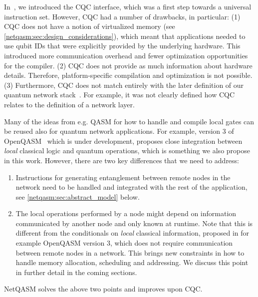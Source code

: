 In~\cite{dahlberg2018simulaqron}, we introduced the \ac{CQC} interface, which was a first step towards a universal instruction set.
However, \ac{CQC} had a number of drawbacks, in particular:
    (1) \ac{CQC} does not have a notion of virtualized memory (see \cref{netqasm:sec:design_considerations}), which meant that applications needed to use qubit IDs that were explicitly provided by the underlying hardware.
        This introduced more communication overhead and fewer optimization opportunities for the compiler.
    (2) \ac{CQC} does not provide as much information about hardware details.
        Therefore, platform-specific compilation and optimization is not possible.
    (3) Furthermore, \ac{CQC} does not match entirely with the later definition of our quantum network stack~\cite{dahlberg2019linklayer, kozlowski2020networklayer}.
        For example, it was not clearly defined how \ac{CQC} relates to the definition of a network layer.

Many of the ideas from e.g. QASM for how to handle and compile local gates can be reused also for quantum network applications.
For example, version 3 of OpenQASM~\cite{cross2021openqasm} which is under development, proposes close integration between \emph{local} classical logic and quantum operations, which is something we also propose in this work.
However, there are two key differences that we need to address:
\begin{enumerate}
      \item Instructions for generating entanglement between remote nodes in the network need to be handled and integrated with the rest of the application, see \cref{netqasm:sec:abstract_model} below.
      \item The local operations performed by a node might depend on information communicated by another node and only known at runtime.
            Note that this is different from the conditionals on \emph{local} classical information, proposed in for example OpenQASM version 3, which does not require communication between remote nodes in a network.
            This brings new constraints in how to handle memory allocation, scheduling and addressing.
            We discuss this point in further detail in the coming sections.
\end{enumerate}
\ac{NetQASM} solves the above two points and improves upon \ac{CQC}.


